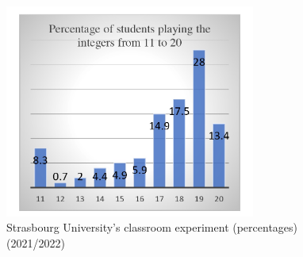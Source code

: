 \begin{Article}
\begin{refsection}[Umbhauer]
\begin{table}[h!]
\caption{Some experiments on the 11--20 money request game with
bonus 20, as well as the symmetric mixed Nash equilibrium and the mixed
minimax regret strategy}\label{tab1}
\centering
{}
\end{table}


\begin{figure}[h]
    \centering
    \caption{Strasbourg University's classroom experiment (percentages) (2021/2022)}
    \includegraphics[height=7cm]{Articles-bons-a-composer/07_Umbhauer_en/07_Umbhauer_en_figures/Umbhauer_fig1.jpeg}
\end{figure}



\end{refsection}
\end{Article}
